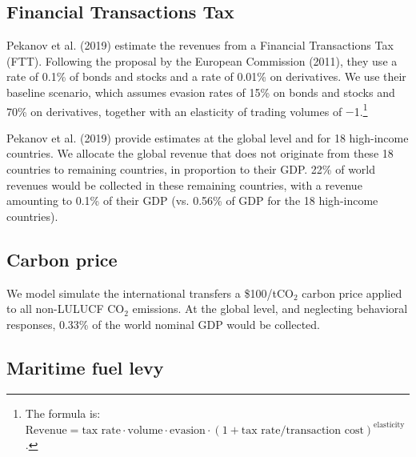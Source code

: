 \documentclass[12pt,english]{article}
\begin{document}
\subsection{Financial Transactions Tax}\label{sec:ftt}

Pekanov et al. (2019)\cite{pekanov_global_2019} estimate the revenues from a Financial Transactions Tax (FTT). Following the proposal by the European Commission (2011), they use a rate of 0.1\% of bonds and stocks and a rate of 0.01\% on derivatives. We use their baseline scenario, which assumes evasion rates of 15\% on bonds and stocks and 70\% on derivatives, together with an elasticity of trading volumes of $-$1.\footnote{The formula is: $\text{Revenue} = \text{tax rate} \cdot \text{volume} \cdot \text{evasion} \cdot \left(1 + \text{tax rate} / \text{transaction cost}\right)^\text{elasticity}$.} 

Pekanov et al. (2019)\cite{pekanov_global_2019} provide estimates at the global level and for 18 high-income countries. We allocate the global revenue that does not originate from these 18 countries to remaining countries, in proportion to their GDP. 22\% of world revenues would be collected in these remaining countries, with a revenue amounting to 0.1\% of their GDP (vs. 0.56\% of GDP for the 18 high-income countries).


\subsection{Carbon price}\label{sec:carbon}

We model simulate the international transfers a \$100/tCO$_\text{2}$ carbon price applied to all non-LULUCF CO$_\text{2}$ emissions. At the global level, and neglecting behavioral responses, 0.33\% of the world nominal GDP would be collected. 

\subsection{Maritime fuel levy}\label{sec:wealth}
\end{document}

